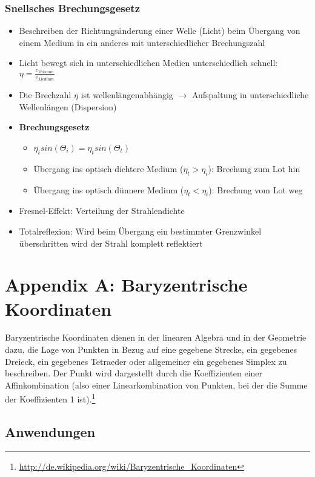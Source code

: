 \subsubsection{Snellsches Brechungsgesetz}
\begin{itemize}
	\item Beschreiben der Richtungsänderung einer Welle (Licht) beim Übergang von einem Medium in ein anderes mit unterschiedlicher Brechungszahl
	\item Licht bewegt sich in unterschiedlichen Medien unterschiedlich schnell: \(\eta = \frac{c_{Vakuum}}{c_{Medium}}\)
	\item Die Brechzahl \(\eta\) ist wellenlängenabhängig \(\rightarrow\) Aufspaltung in unterschiedliche Wellenlängen (Dispersion)
	\item \textbf{Brechungsgesetz}
	\begin{itemize}
		\item \(\eta_i sin(\Theta_i) = \eta_t sin(\Theta_t)\)
		\item Übergang ins optisch dichtere Medium (\(\eta_t > \eta_i\)): Brechung zum Lot hin
		\item Übergang ins optisch dünnere Medium (\(\eta_t < \eta_i\)): Brechung vom Lot weg
	\end{itemize}
	\item Fresnel-Effekt: Verteilung der Strahlendichte
	\item Totalreflexion: Wird beim Übergang ein bestimmter Grenzwinkel überschritten wird der Strahl komplett reflektiert
\end{itemize}



\section{Appendix A: Baryzentrische Koordinaten}
Baryzentrische Koordinaten dienen in der linearen Algebra und in der Geometrie dazu, die Lage von Punkten in Bezug auf eine gegebene Strecke, ein gegebenes Dreieck, ein gegebenes Tetraeder oder allgemeiner ein gegebenes Simplex zu beschreiben. Der Punkt wird dargestellt durch die Koeffizienten einer Affinkombination (also einer Linearkombination von Punkten, bei der die Summe der Koeffizienten 1 ist).\footnote{\url{http://de.wikipedia.org/wiki/Baryzentrische_Koordinaten}}

\subsection{Anwendungen}

